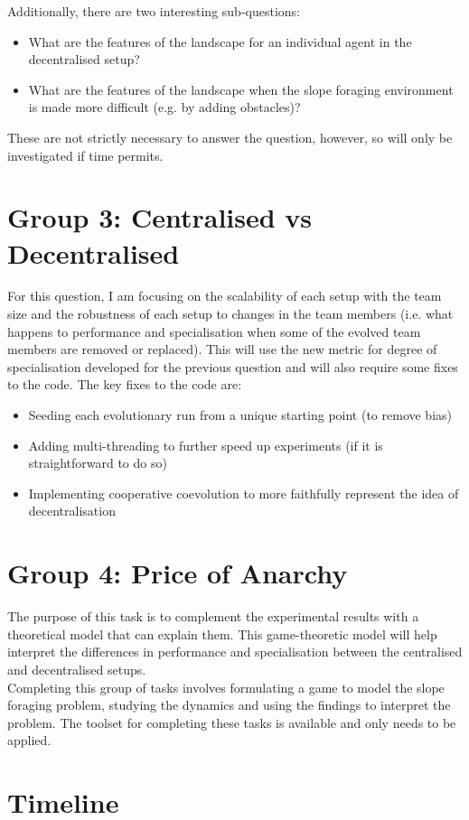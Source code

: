 \documentclass[12pt]{article}
\begin{document}
Additionally, there are two interesting sub-questions:

\begin{itemize}

\item What are the features of the landscape for an individual agent in the decentralised setup?
\item What are the features of the landscape when the slope foraging environment is made more difficult (e.g. by adding obstacles)?

\end{itemize}

These are not strictly necessary to answer the question, however, so will only be investigated if time permits.


\section{Group 3: Centralised vs Decentralised}

For this question, I am focusing on the scalability of each setup with the team size and the robustness of each setup to changes in the team members (i.e. what happens to performance and specialisation when some of the evolved team members are removed or replaced). This will use the new metric for degree of specialisation developed for the previous question and will also require some fixes to the code. The key fixes to the code are:\\

\begin{itemize}

\item Seeding each evolutionary run from a unique starting point (to remove bias)
\item Adding multi-threading to further speed up experiments (if it is straightforward to do so)
\item Implementing cooperative coevolution to more faithfully represent the idea of decentralisation

\end{itemize}

\section{Group 4: Price of Anarchy}

The purpose of this task is to complement the experimental results with a theoretical model that can explain them. This game-theoretic model will help interpret the differences in performance and specialisation between the centralised and decentralised setups.\\

Completing this group of tasks involves formulating a game to model the slope foraging problem, studying the dynamics and using the findings to interpret the problem. The toolset for completing these tasks is available and only needs to be applied.\\

\section{Timeline} \label{timeline}
\end{document}
